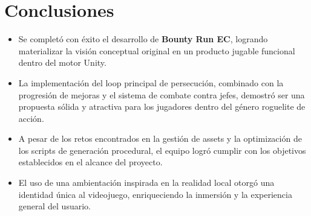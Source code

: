 \section{Conclusiones}

\begin{itemize}
    \item Se completó con éxito el desarrollo de \textbf{Bounty Run EC}, logrando materializar la visión conceptual original en un producto jugable funcional dentro del motor Unity.
    \item La implementación del loop principal de persecución, combinado con la progresión de mejoras y el sistema de combate contra jefes, demostró ser una propuesta sólida y atractiva para los jugadores dentro del género roguelite de acción.
    \item A pesar de los retos encontrados en la gestión de assets y la optimización de los scripts de generación procedural, el equipo logró cumplir con los objetivos establecidos en el alcance del proyecto.
    \item El uso de una ambientación inspirada en la realidad local otorgó una identidad única al videojuego, enriqueciendo la inmersión y la experiencia general del usuario.
\end{itemize}
